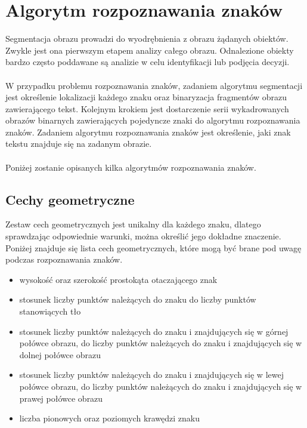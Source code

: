 \section{Algorytm rozpoznawania znaków}
Segmentacja obrazu prowadzi do wyodrębnienia z obrazu żądanych obiektów. Zwykle jest ona pierwszym etapem analizy całego obrazu. Odnalezione obiekty bardzo często poddawane są analizie w celu identyfikacji lub podjęcia decyzji.
\paragraph{}
W przypadku problemu rozpoznawania znaków, zadaniem algorytmu segmentacji jest określenie lokalizacji każdego znaku oraz binaryzacja fragmentów obrazu zawierającego tekst. Kolejnym krokiem jest dostarczenie serii wykadrowanych obrazów binarnych zawierających pojedyncze znaki do algorytmu rozpoznawania znaków. Zadaniem algorytmu rozpoznawania znaków jest określenie, jaki znak tekstu znajduje się na zadanym obrazie.
\paragraph{}
Poniżej zostanie opisanych kilka algorytmów rozpoznawania znaków.
\subsection{Cechy geometryczne}
Zestaw cech geometrycznych jest unikalny dla każdego znaku, dlatego sprawdzając odpowiednie warunki, można określić jego dokładne znaczenie. Poniżej znajduje się lista cech geometrycznych, które mogą być brane pod uwagę podczas rozpoznawania znaków.
\begin{itemize}
  \item wysokość oraz szerokość prostokąta otaczającego znak
  \item stosunek liczby punktów należących do znaku do liczby punktów stanowiących tło
  \item stosunek liczby punktów należących do znaku i znajdujących się w górnej połówce obrazu, do liczby punktów należących do znaku i znajdujących się w dolnej połówce obrazu
    \item stosunek liczby punktów należących do znaku i znajdujących się w lewej połówce  obrazu, do liczby punktów należących do znaku i znajdujących się w prawej połówce obrazu
    \item liczba pionowych oraz poziomych krawędzi znaku
\end{itemize}
